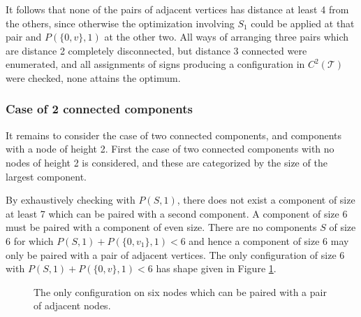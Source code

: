\documentclass[a4paper, 12pt, notitlepage]{amsart}
\newcommand{\sT}{\mathscr{T}}
\theoremstyle{remark}
\begin{document}
 It follows that none of the pairs of adjacent vertices has distance at least 4 from the others, since otherwise the optimization involving $S_1$ could be applied at that pair and $P(\{0,v\},1)$ at the other two.  All ways of arranging three pairs which are distance 2 completely disconnected, but distance 3 connected were enumerated, and all assignments of signs producing a configuration in $C^2(\sT)$ were checked, none attains the optimum.
 
 
 \subsubsection*{Case of 2 connected components}
 
 It remains to consider the case of two connected components, and components with a node of height 2. First the case of two connected components with no nodes of height 2 is considered, and these are categorized by the size of the largest component.  
 
 By exhaustively checking with $P(S, 1)$, there does not exist a component of size at least 7 which can be paired with a second component.  A component of size 6 must be paired with a component of even size.  There are no components $S$ of size 6 for which $P(S, 1) + P(\{0, v_1\}, 1) < 6$ and hence a component of size 6 may only be paired with a pair of adjacent vertices.  The only configuration of size 6 with $P(S, 1) + P(\{0,v\},1) <6$ has shape given in Figure \ref{fig:hexagon}.
 \begin{figure}
 \caption{The only configuration on six nodes which can be paired with a pair of adjacent nodes.}
 \label{fig:hexagon}\end{figure}
\end{document}
